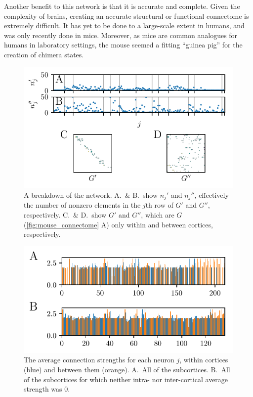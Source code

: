 Another benefit to this network is that it is accurate and complete.
Given the complexity of brains, creating an accurate structural or functional connectome is extremely difficult.
It has yet to be done to a large-scale extent in humans, and was only recently done in mice.
Moreover, as mice are common analogues for humans in laboratory settings, the mouse seemed a fitting ``guinea pig'' for the creation of chimera states.

\begin{figure}[ht]
  \centering
  \includegraphics[width=\columnwidth]{figure/primes_100dpi.pdf}
  \caption[Network breakdown]{A breakdown of the network.
    A.\ \& B.\ show $n_{j}'$ and $n_{j}''$, effectively the number of nonzero elements in the $j$th row of $G'$ and $G''$, respectively.
    C.\ \& D.\ show $G'$ and $G''$, which are $G$ (\cref{fig:mouse_connectome} A) only within and between cortices, respectively.
  }
  \label{fig:primes}
\end{figure}

\begin{figure}[ht]
  \centering
  \includegraphics[width=\columnwidth]{figure/g_over_n_100dpi.pdf}
  \caption[Average strengths]{The average connection strengths for each neuron $j$, within cortices (blue) and between them (orange).
    A.\ All of the subcortices.
    B.\ All of the subcortices for which neither intra- nor inter-cortical average strength was 0.
  }
  \label{fig:average_strengths}
\end{figure}

